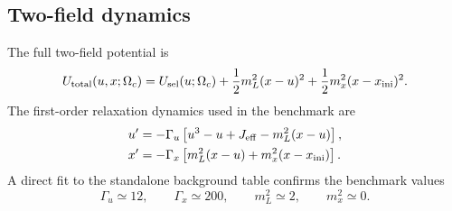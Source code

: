 ﻿\documentclass[11pt,prd,preprint,nofootinbib,amsmath,amssymb]{revtex4-2}
\begin{document}
\begin{table}[t]
\centering
\small
{}
\caption{Drain-prescription robustness summary. The comparison records which
transfer prescriptions were retained or rejected in the benchmark construction.
The zero-floor prescription is used in the main runs; the signed and smooth
zero-floor variants provide prescription-level sanity checks, while the naive
softplus variant is excluded because it introduces unwanted high-redshift
leakage.}
\label{tab:drain_prescription_robustness}
\end{table}

\subsection{Two-field dynamics}

The full two-field potential is
\begin{equation}
U_{\rm total}(u,x;\Omega_c)
=
U_{\rm sel}(u;\Omega_c)
+
\frac12m_L^2(x-u)^2
+
\frac12m_x^2(x-x_{\rm ini})^2.
\end{equation}
The first-order relaxation dynamics used in the benchmark are
\begin{align}
u'
&=
-\Gamma_u
\left[
u^3-u+J_{\rm eff}
-
m_L^2(x-u)
\right],
\label{eq:u_rhs}
\\
x'
&=
-\Gamma_x
\left[
m_L^2(x-u)+m_x^2(x-x_{\rm ini})
\right].
\label{eq:x_rhs}
\end{align}
A direct fit to the standalone background table confirms the benchmark values
\begin{equation}
\Gamma_u\simeq12,
\qquad
\Gamma_x\simeq200,
\qquad
m_L^2\simeq2,
\qquad
m_x^2\simeq0.
\end{equation}
\end{document}

